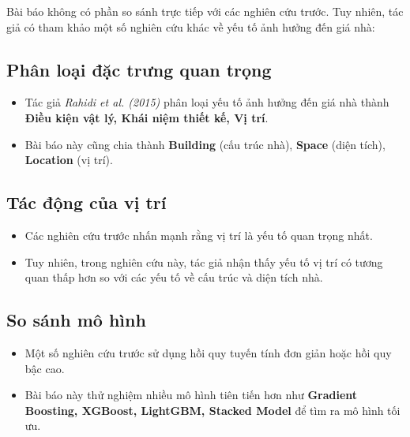 Bài báo không có phần so sánh trực tiếp với các nghiên cứu trước. Tuy nhiên, tác giả có tham khảo một số nghiên cứu khác về yếu tố ảnh hưởng đến giá nhà:

\subsection{Phân loại đặc trưng quan trọng}
\begin{itemize}
    \item Tác giả \textit{Rahidi et al. (2015)} phân loại yếu tố ảnh hưởng đến giá nhà thành \textbf{Điều kiện vật lý, Khái niệm thiết kế, Vị trí}.
    \item Bài báo này cũng chia thành \textbf{Building} (cấu trúc nhà), \textbf{Space} (diện tích), \textbf{Location} (vị trí).
\end{itemize}

\subsection{Tác động của vị trí}
\begin{itemize}
    \item Các nghiên cứu trước nhấn mạnh rằng vị trí là yếu tố quan trọng nhất.
    \item Tuy nhiên, trong nghiên cứu này, tác giả nhận thấy yếu tố vị trí có tương quan thấp hơn so với các yếu tố về cấu trúc và diện tích nhà.
\end{itemize}

\subsection{So sánh mô hình}
\begin{itemize}
    \item Một số nghiên cứu trước sử dụng hồi quy tuyến tính đơn giản hoặc hồi quy bậc cao.
    \item Bài báo này thử nghiệm nhiều mô hình tiên tiến hơn như \textbf{Gradient Boosting, XGBoost, LightGBM, Stacked Model} để tìm ra mô hình tối ưu.
\end{itemize}
